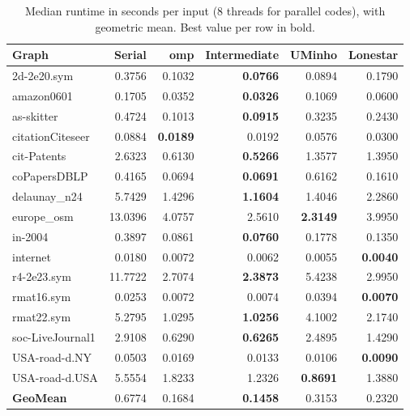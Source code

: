 \documentclass[11pt,a4paper]{article}
\begin{document}
\begin{table}[H]
  \centering
  \small
  \setlength{\tabcolsep}{4pt}
  \caption{Median runtime in seconds per input (8 threads for parallel codes), with geometric mean. Best value per row in bold.}
  \label{tab:runtime}
  \begin{tabular}{lrrrrr}
    \toprule
    \textbf{Graph} & \textbf{Serial} & \textbf{omp} & \textbf{Intermediate} & \textbf{UMinho} & \textbf{Lonestar} \\
    \midrule
    2d-2e20.sym             & 0.3756 & 0.1032 & \textbf{0.0766} & 0.0894 & 0.1790 \\
    amazon0601              & 0.1705 & 0.0352 & \textbf{0.0326} & 0.1069 & 0.0600 \\
    as-skitter              & 0.4724 & 0.1013 & \textbf{0.0915} & 0.3235 & 0.2430 \\
    citationCiteseer        & 0.0884 & \textbf{0.0189} & 0.0192 & 0.0576 & 0.0300 \\
    cit-Patents             & 2.6323 & 0.6130 & \textbf{0.5266} & 1.3577 & 1.3950 \\
    coPapersDBLP            & 0.4165 & 0.0694 & \textbf{0.0691} & 0.6162 & 0.1610 \\
    delaunay\_n24           & 5.7429 & 1.4296 & \textbf{1.1604} & 1.4046 & 2.2860 \\
    europe\_osm             & 13.0396 & 4.0757 & 2.5610 & \textbf{2.3149} & 3.9950 \\
    in-2004                 & 0.3897 & 0.0861 & \textbf{0.0760} & 0.1778 & 0.1350 \\
    internet                & 0.0180 & 0.0072 & 0.0062 & 0.0055 & \textbf{0.0040} \\
    r4-2e23.sym             & 11.7722 & 2.7074 & \textbf{2.3873} & 5.4238 & 2.9950 \\
    rmat16.sym              & 0.0253 & 0.0072 & 0.0074 & 0.0394 & \textbf{0.0070} \\
    rmat22.sym              & 5.2795 & 1.0295 & \textbf{1.0256} & 4.1002 & 2.1740 \\
    soc-LiveJournal1        & 2.9108 & 0.6290 & \textbf{0.6265} & 2.4895 & 1.4290 \\
    USA-road-d.NY           & 0.0503 & 0.0169 & 0.0133 & 0.0106 & \textbf{0.0090} \\
    USA-road-d.USA          & 5.5554 & 1.8233 & 1.2326 & \textbf{0.8691} & 1.3880 \\
    \midrule
    \textbf{GeoMean}        & 0.6774 & 0.1684 & \textbf{0.1458} & 0.3153 & 0.2320 \\
    \bottomrule
  \end{tabular}
\end{table}
 
\end{document}
